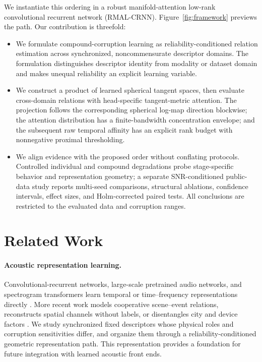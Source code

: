 We instantiate this ordering in a robust manifold-attention low-rank convolutional recurrent network (RMAL-CRNN). Figure~\ref{fig:framework} previews the path. Our contribution is threefold:
\begin{itemize}
  \item We formulate compound-corruption learning as reliability-conditioned relation estimation across synchronized, noncommensurate descriptor domains. The formulation distinguishes descriptor identity from modality or dataset domain and makes unequal reliability an explicit learning variable.
  \item We construct a product of learned spherical tangent spaces, then evaluate cross-domain relations with head-specific tangent-metric attention. The projection follows the corresponding spherical log-map direction blockwise; the attention distribution has a finite-bandwidth concentration envelope; and the subsequent raw temporal affinity has an explicit rank budget with nonnegative proximal thresholding.
  \item We align evidence with the proposed order without conflating protocols. Controlled individual and compound degradations probe stage-specific behavior and representation geometry; a separate SNR-conditioned public-data study reports multi-seed comparisons, structural ablations, confidence intervals, effect sizes, and Holm-corrected paired tests. All conclusions are restricted to the evaluated data and corruption ranges.
\end{itemize}

\section{Related Work}

\paragraph{Acoustic representation learning.}
Convolutional-recurrent networks, large-scale pretrained audio networks, and spectrogram transformers learn temporal or time--frequency representations directly \citep{cakir2017crnn,kong2020panns,gong2021ast}. More recent work models cooperative scene--event relations, reconstructs spatial channels without labels, or disentangles city and device factors \citep{hou2024cooperative,yang2024spatial,tan2024disentanglement}. We study synchronized fixed descriptors whose physical roles and corruption sensitivities differ, and organize them through a reliability-conditioned geometric representation path. This representation provides a foundation for future integration with learned acoustic front ends.

